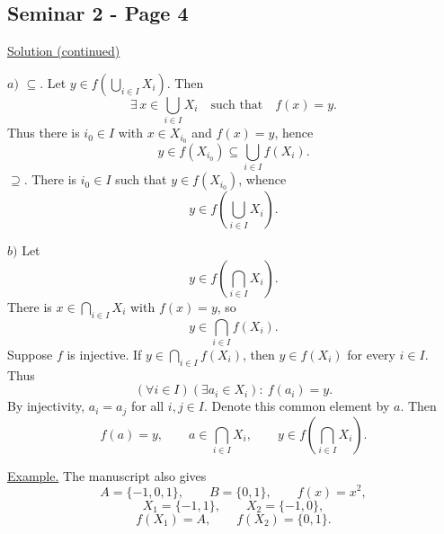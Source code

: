 
\subsection*{Seminar 2 - Page 4}

\noindent\underline{Solution (continued)}

\medskip
\noindent $a)$ \underline{$\subseteq$}.
Let $y\in f\left(\bigcup_{i\in I}X_i\right)$. Then
\[
\exists\,x\in\bigcup_{i\in I}X_i\quad\text{such that}\quad f(x)=y.
\]
\noindent Thus there is $i_0\in I$ with $x\in X_{i_0}$ and $f(x)=y$, hence
\[
 y\in f(X_{i_0})\subseteq\bigcup_{i\in I}f(X_i).
\]
\noindent \underline{$\supseteq$}.
There is $i_0\in I$ such that
$y\in f(X_{i_0})$, whence
\[
 y\in f\left(\bigcup_{i\in I}X_i\right).
\]

\medskip
\noindent $b)$ Let
\[
 y\in f\left(\bigcap_{i\in I}X_i\right).
\]
\noindent There is $x\in\bigcap_{i\in I}X_i$ with $f(x)=y$, so
\[
 y\in\bigcap_{i\in I}f(X_i).
\]
\noindent Suppose $f$ is injective. If
$y\in\bigcap_{i\in I}f(X_i)$, then
$y\in f(X_i)$ for every $i\in I$. Thus
\[
 (\forall i\in I)(\exists a_i\in X_i):\ f(a_i)=y.
\]
\noindent By injectivity, $a_i=a_j$ for all $i,j\in I$.
Denote this common element by $a$. Then
\[
 f(a)=y,\qquad a\in\bigcap_{i\in I}X_i,
 \qquad y\in f\left(\bigcap_{i\in I}X_i\right).
\]

\medskip
\noindent\underline{Example.} The manuscript also gives
\[
 A=\{-1,0,1\},\qquad B=\{0,1\},\qquad f(x)=x^2,
\]
\[
 X_1=\{-1,1\},\qquad X_2=\{-1,0\},
\]
\[
 f(X_1)=A,\qquad f(X_2)=\{0,1\}.
\]

